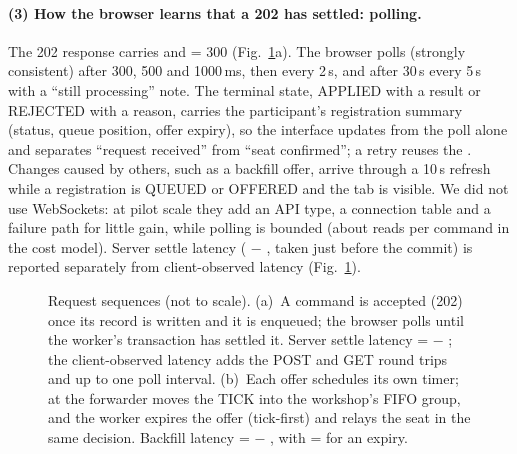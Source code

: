 \paragraph{(3) How the browser learns that a 202 has settled: polling.}
The 202 response carries  and  = 300 (Fig.~\ref{fig:seq}a). The browser
polls  (strongly consistent) after 300, 500 and 1000\,ms, then every 2\,s,
and after 30\,s every 5\,s with a \enquote{still processing} note. The terminal state, APPLIED with a
result or REJECTED with a reason, carries the participant's registration summary (status, queue
position, offer expiry), so the interface updates from the poll alone and separates
\enquote{request received} from \enquote{seat confirmed}; a retry reuses the . Changes
caused by others, such as a backfill offer, arrive through a 10\,s refresh while a registration is
QUEUED or OFFERED and the tab is visible. We did not use WebSockets: at pilot scale they add an API
type, a connection table and a failure path for little gain, while polling is bounded (about
\CostAssumeReadsPerCommand{} reads per command in the cost model). Server settle latency
( $-$ ,  taken just before the commit) is reported
separately from client-observed latency (Fig.~\ref{fig:seq}).

\begin{figure}[t]
  \centering
  \caption{Request sequences (not to scale). (a)~A command is accepted (202) once its record is
  written and it is enqueued; the browser polls until the worker's transaction has settled it.
  Server settle latency =  $-$ ; the client-observed latency adds
  the POST and GET round trips and up to one poll interval. (b)~Each offer schedules its own timer; at  the forwarder
  moves the TICK into the workshop's FIFO group, and the worker expires the offer (tick-first) and
  relays the seat in the same decision. Backfill latency =  $-$
  , with  =  for an expiry.}
  \label{fig:seq}
\end{figure}

